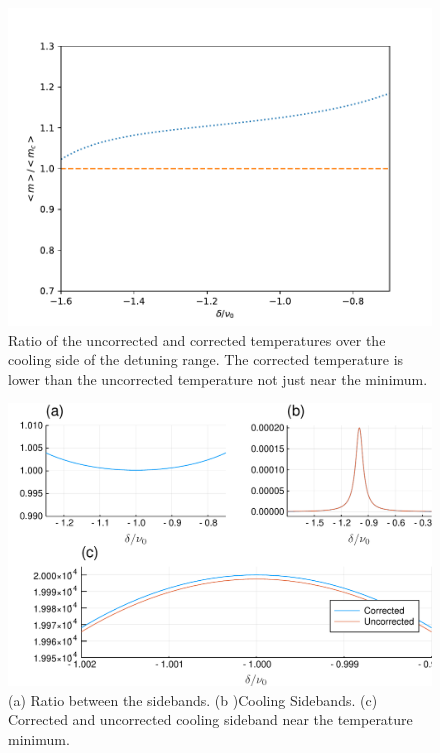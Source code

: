 \documentclass[reprint, amsmath,amssymb, aps,pra]{revtex4-1}
\begin{document}
\begin{figure}
\includegraphics[scale=.5]{TempPropGorden1.pdf}
\caption{Ratio of the uncorrected and corrected temperatures over the cooling side of the detuning range. The corrected temperature is lower than the uncorrected temperature not just near the minimum.}
\label{fig:TempRatio}
\end{figure}



\begin{figure}
\includegraphics[scale=.4]{SidebandsGorden1.pdf} 
\caption{(a) Ratio between the sidebands. (b )Cooling Sidebands.  (c) Corrected and uncorrected cooling sideband near the temperature minimum. }
\label{fig:SideBands}
\end{figure}
\end{document}

